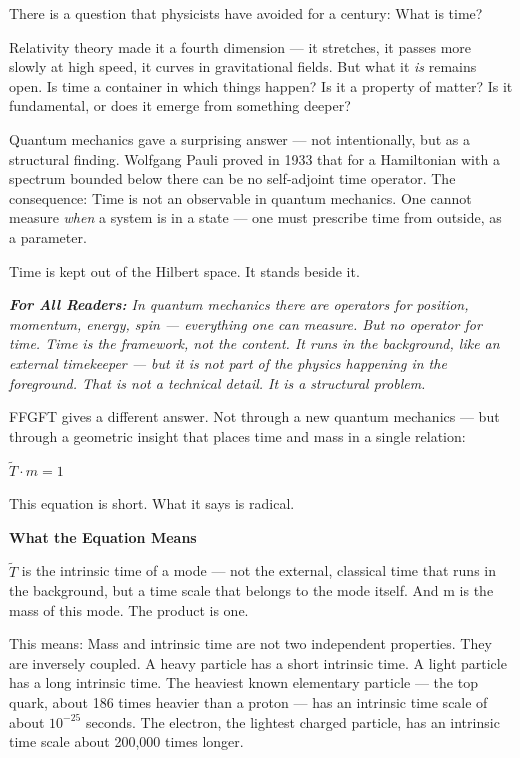 \documentclass[11pt,oneside]{book}
\newenvironment{laierspur}{%
  \par\vspace{4pt}%
  \noindent\small\itshape\color{blue!60!black}%
  \textbf{For All Readers:}\enspace\ignorespaces}{%
  \par\vspace{4pt}\normalsize\normalfont\normalcolor}
\begin{document}
There is a question that physicists have avoided for a century: What is time?

Relativity theory made it a fourth dimension — it stretches, it passes more
slowly at high speed, it curves in gravitational fields. But what it
\textit{is} remains open. Is time a container in which things happen? Is it a
property of matter? Is it fundamental, or does it emerge from something
deeper?

Quantum mechanics gave a surprising answer — not intentionally, but as a
structural finding. Wolfgang Pauli proved in 1933 that for a Hamiltonian
with a spectrum bounded below there can be no self-adjoint time operator.
The consequence: Time is not an observable in quantum mechanics. One cannot
measure \textit{when} a system is in a state — one must prescribe time from
outside, as a parameter.

Time is kept out of the Hilbert space. It stands beside it.

\begin{laierspur}
In quantum mechanics there are operators for position, momentum, energy,
spin — everything one can measure. But no operator for time. Time is the
framework, not the content. It runs in the background, like an external
timekeeper — but it is not part of the physics happening in the foreground.
That is not a technical detail. It is a structural problem.
\end{laierspur}

FFGFT gives a different answer. Not through a new quantum mechanics —
but through a geometric insight that places time and mass in a single
relation:

\textbf{$\tilde{T}\cdot m = 1$}

This equation is short. What it says is radical.

\textbf{What the Equation Means}

$\tilde{T}$ is the intrinsic time of a mode — not the external, classical time
that runs in the background, but a time scale that belongs to the mode
itself. And m is the mass of this mode. The product is one.

This means: Mass and intrinsic time are not two independent properties.
They are inversely coupled. A heavy particle has a short intrinsic time. A
light particle has a long intrinsic time. The heaviest known elementary
particle — the top quark, about 186 times heavier than a proton — has an
intrinsic time scale of about $10^{-25}$ seconds. The electron, the lightest
charged particle, has an intrinsic time scale about 200,000 times longer.
\end{document}
